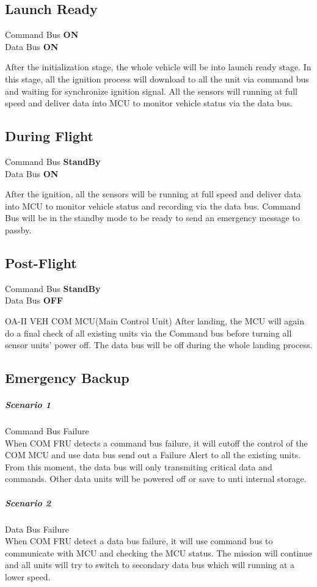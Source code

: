 \documentclass[12pt,article]{memoir}
\begin{document}
\subsection{Launch Ready}
\begin{center}
Command Bus \textbf{ON}\\
Data Bus \textbf{ON}
\end{center}
After the initialization stage, the whole vehicle will be into launch ready stage. In this stage, all the ignition process will download to all the unit via command bus and waiting for synchronize ignition signal. All the sensors will running at full speed and deliver data into MCU to monitor vehicle status via the data bus.
\subsection{During Flight}
\begin{center}
Command Bus \textbf{StandBy}\\
Data Bus \textbf{ON}
\end{center}
After the ignition, all the sensors will be running at full speed and deliver data into MCU to monitor vehicle status and recording via the data bus. Command Bus will be in the standby mode to be ready to send an emergency message to passby.
\subsection{Post-Flight}
\begin{center}
Command Bus \textbf{StandBy}\\
Data Bus \textbf{OFF}
\end{center}OA-II VEH COM MCU(Main Control Unit)
After landing, the MCU will again do a final check of all existing units via the Command bus before turning all sensor units' power off. The data bus will be off during the whole landing process.
\subsection{Emergency Backup}
\subparagraph{Scenario 1}Command Bus Failure \\
When COM FRU detects a command bus failure, it will cutoff the control of the COM MCU and use data bus send out a Failure Alert to all the existing units. From this moment, the data bus will only transmiting critical data and commands. Other data units will be powered off or save to unti internal storage.
\subparagraph{Scenario 2 }Data Bus Failure \\
When COM FRU detect a data bus failure, it will use command bus to communicate with MCU and checking the MCU status. The mission will continue and all units will try to switch to secondary data bus which will running at a lower speed. 
\end{document}

